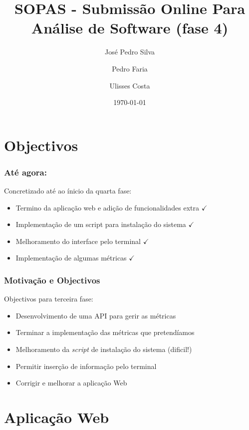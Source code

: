 \documentclass{beamer}
\title{SOPAS - Submissão Online Para Análise de Software (fase 4)}
\author{José Pedro Silva \and
Pedro Faria \and
Ulisses Costa
}
\date{\today}
\institute{Engenharia de Linguagens\\
Projecto integrado
}
\begin{document}
\begin{frame}
   \titlepage
\end{frame}

\section{Objectivos}
\begin{frame} \frametitle{Até agora:}
Concretizado até ao ínicio da quarta fase:
\begin{itemize}
\item Termino da aplicação web e adição de funcionalidades extra {\color{green}$\checkmark$}
\item Implementação de um script para instalação do sistema {\color{green}$\checkmark$}
\item Melhoramento do interface pelo terminal {\color{green}$\checkmark$}
\item Implementação de algumas métricas {\color{green}$\checkmark$}
\end{itemize}
\end{frame}

\begin{frame} \frametitle{Motivação e Objectivos}
Objectivos para terceira fase:
\begin{itemize}
\item Desenvolvimento de uma API para gerir as métricas
\item Terminar a implementação das métricas que pretendíamos
\item Melhoramento da \emph{script} de instalação do sistema (dificil!)
\item Permitir inserção de informação pelo terminal
\item Corrigir e melhorar a aplicação Web
\end{itemize}
\end{frame}

\section{Aplicação Web}
\end{document}
